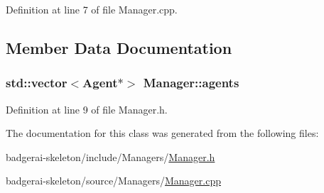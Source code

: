 Definition at line 7 of file Manager.\-cpp.


\begin{DoxyCode}
{
}
\end{DoxyCode}


\subsection{Member Data Documentation}
\hypertarget{classManager_af119ed18f4bf940d67e4ed26b449be68}{
\subsubsection[{agents}]{\setlength{\rightskip}{0pt plus 5cm}std\-::vector$<${\bf Agent}$\ast$$>$ {\bf Manager\-::agents}}}\label{classManager_af119ed18f4bf940d67e4ed26b449be68}


Definition at line 9 of file Manager.\-h.



The documentation for this class was generated from the following files\-:\begin{DoxyCompactItemize}
\item 
badgerai-\/skeleton/include/\-Managers/\hyperlink{Manager_8h}{Manager.\-h}\item 
badgerai-\/skeleton/source/\-Managers/\hyperlink{Manager_8cpp}{Manager.\-cpp}\end{DoxyCompactItemize}
